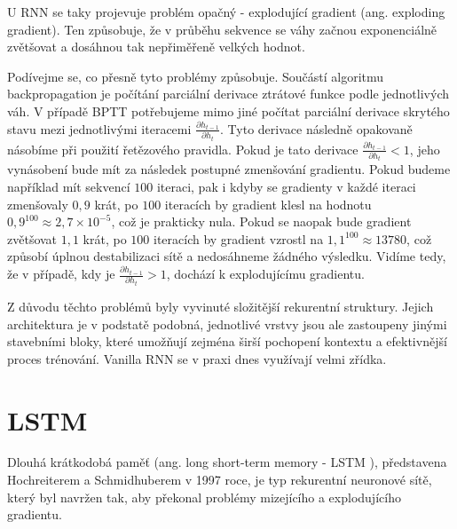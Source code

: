 U RNN se taky projevuje problém opačný - explodující gradient (ang. exploding
gradient). Ten způsobuje, že v průběhu sekvence se váhy začnou exponenciálně
zvětšovat a dosáhnou tak nepřiměřeně velkých hodnot.

Podívejme se, co přesně tyto problémy způsobuje. Součástí algoritmu
backpropagation je počítání parciální derivace ztrátové funkce podle
jednotlivých váh. V případě BPTT potřebujeme mimo jiné počítat parciální
derivace skrytého stavu mezi jednotlivými iteracemi $\frac{\partial
        h_{t-1}}{\partial h_t}$. Tyto derivace následně opakovaně násobíme při použití
řetězového pravidla. Pokud je tato derivace $\frac{\partial h_{t-1}}{\partial
        h_t}<1$, jeho vynásobení bude mít za následek postupné zmenšování gradientu.
Pokud budeme například mít sekvencí $100$ iteraci, pak i kdyby se gradienty v
každé iteraci zmenšovaly $0,9$ krát, po $100$ iteracích by gradient klesl na
hodnotu $0,9^{100} \approx 2,7 \times 10^{-5}$, což je prakticky nula. Pokud se
naopak bude gradient zvětšovat $1,1$ krát, po $100$ iteracích by gradient
vzrostl na $1,1^{100} \approx 13 780$, což způsobí úplnou destabilizaci sítě a
nedosáhneme žádného výsledku. Vidíme tedy, že v případě, kdy je $\frac{\partial
        h_{t-1}}{\partial h_t}>1$, dochází k explodujícímu gradientu.

Z důvodu těchto problémů byly vyvinuté složitější rekurentní struktury. Jejich
architektura je v podstatě podobná, jednotlivé vrstvy jsou ale zastoupeny
jinými stavebními bloky, které umožňují zejména širší pochopení kontextu a
efektivnější proces trénování. Vanilla RNN se v praxi dnes využívají velmi
zřídka.

\section{LSTM}

Dlouhá krátkodobá paměť (ang. long short-term memory - LSTM ), představena
Hochreiterem a Schmidhuberem v 1997 roce, je typ rekurentní neuronové sítě,
který byl navržen tak, aby překonal problémy mizejícího a explodujícího
gradientu.

